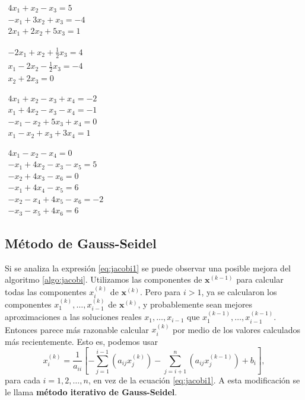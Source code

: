 \begin{enumerate}
\begin{enumerate}
\begin{multicols}{2}
		\item $\begin{array}{r}
				4x_1 + x_2 - x_3 = 5\\
				-x_1 + 3x_2 + x_3 = -4\\
				2x_1 + 2x_2 + 5x_3 = 1
			  \end{array}$
		\item $\begin{array}{r}
				-2x_1 + x_2 + \frac{1}{2}x_3 = 4\\
				x_1 - 2x_2 - \frac{1}{2}x_3 = -4\\
				x_2 + 2x_3 = 0
			\end{array}$
		\item $\begin{array}{r}
				4x_1 + x_2 - x_3 + x_4 = -2\\
				x_1 + 4x_2 - x_3 - x_4 = -1\\
				-x_1 - x_2 + 5x_3 + x_4 = 0\\
				x_1 - x_2 + x_3 + 3x_4 = 1
			   \end{array}$
		\item $\begin{array}{r}
				4x_1 - x_2 - x_4 = 0\\
				-x_1 + 4x_2 - x_3 - x_5 = 5\\
				-x_2 + 4x_3 - x_6 = 0\\
				-x_1 + 4x_4 - x_5 = 6\\
				-x_2 - x_4 + 4x_5 - x_6 = -2\\
				-x_3 - x_5 + 4x_6 = 6
			\end{array}$
		\end{multicols}		
      \end{enumerate}
\end{enumerate}



\subsection{Método de Gauss-Seidel}
Si se analiza la expresión \ref{eq:jacobi1} se puede observar una posible mejora del algoritmo \ref{algo:jacobi}. Utilizamos las componentes
de $\textbf{x}^{(k-1)}$ para calcular todas las componentes $x_i^{(k)}$ de $\textbf{x}^{(k)}$. Pero para $i>1$, ya se calcularon los componentes
$x_1^{(k)}, \dots, x_{i-1}^{(k)}$ de $\textbf{x}^{(k)}$, y probablemente sean mejores aproximaciones a las soluciones reales $x_1,\dots,x_{i-1}$
que $x_1^{(k-1)},\dots, x_{i-1}^{(k-1)}$. Entonces parece más razonable calcular $x_i^{(k)}$ por medio de los valores calculados más recientemente.
Esto es, podemos usar
\begin{equation}
  x_i^{(k)}=\frac{1}{a_{ii}}\left[-\sum_{j=1}^{i-1}\left(a_{ij}x_j^{(k)}\right) - \sum_{j=i+1}^{n}\left(a_{ij}x_j^{(k-1)}\right) + b_i \right],
  \label{eq:Gauss-Seidel}
\end{equation}
para cada $i=1,2,\dots,n$, en vez de la ecuación \ref{eq:jacobi1}. A esta modificación se le llama \textbf{método iterativo de Gauss-Seidel}.

